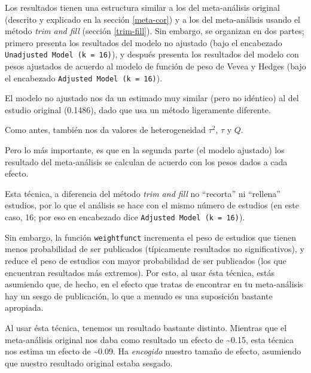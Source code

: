 \documentclass[
  bookmarksnumbered]{article}
\begin{document}
Los resultados tienen una estructura similar a los del meta-análisis original (descrito y explicado en la sección \ref{meta-cor}) y a los del meta-análisis usando el método \emph{trim and fill} (sección \ref{trim-fill}). Sin embargo, se organizan en dos partes; primero presenta los resultados del modelo no ajustado (bajo el encabezado \texttt{Unadjusted\ Model\ (k\ =\ 16)}), y después presenta los resultados del modelo con pesos ajustados de acuerdo al modelo de función de peso de Vevea y Hedges (bajo el encabezado \texttt{Adjusted\ Model\ (k\ =\ 16)}).

El modelo no ajustado nos da un estimado muy similar (pero no idéntico) al del estudio original (0.1486), dado que usa un método ligeramente diferente.

Como antes, también nos da valores de heterogeneidad \(\tau^2\), \(\tau\) y \(Q\).

Pero lo más importante, es que en la segunda parte (el modelo ajustado) los resultado del meta-análisis se calculan de acuerdo con los pesos dados a cada efecto.

Esta técnica, a diferencia del método \emph{trim and fill} no ``recorta'' ni ``rellena'' estudios, por lo que el análisis se hace con el mismo número de estudios (en este caso, 16; por eso en encabezado dice \texttt{Adjusted\ Model\ (k\ =\ 16)}).

Sin embargo, la función \texttt{weightfunct} incrementa el peso de estudios que tienen menos probabilidad de ser publicados (típicamente resultados no significativos), y reduce el peso de estudios con mayor probabilidad de ser publicados (los que encuentran resultados más extremos). Por esto, al usar ésta técnica, estás asumiendo que, de hecho, en el efecto que tratas de encontrar en tu meta-análisis hay un sesgo de publicación, lo que a menudo es una suposición bastante apropiada.

Al usar ésta técnica, tenemos un resultado bastante distinto. Mientras que el meta-análisis original nos daba como resultado un efecto de \textasciitilde0.15, esta técnica nos estima un efecto de \textasciitilde0.09. Ha \emph{encogido} nuestro tamaño de efecto, asumiendo que nuestro resultado original estaba sesgado.
\end{document}
